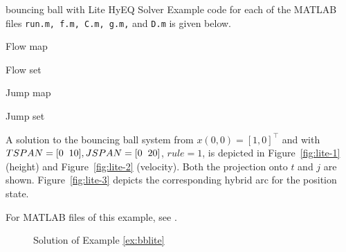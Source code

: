 \begin{example}{bouncing ball with Lite HyEQ Solver}
Example code for each of the MATLAB files {\tt run.m, f.m, C.m, g.m,} and {\tt D.m} is given below.\\
\label{scr:run}

Flow map
\label{scr:f}

Flow set
\label{scr:C}

Jump map
\label{scr:g}

Jump set
\label{scr:D}

A solution to the bouncing ball system from $x(0,0)=[1,0]^\top$ and with $TSPAN = [0 \hspace{2mm} 10], JSPAN = [0 \hspace{2mm} 20]$, $rule =1$, is depicted in Figure~\ref{fig:lite-1} (height) and Figure~\ref{fig:lite-2} (velocity).  Both the projection onto $t$ and $j$ are shown. Figure~\ref{fig:lite-3} depicts the corresponding hybrid arc for the position state.

For MATLAB files of this example, see .

\begin{figure}[ht]
\begin{center}
\qquad
{}
\end{center}
\caption{Solution of Example \ref{ex:bblite}}
\end{figure}

\end{example}

